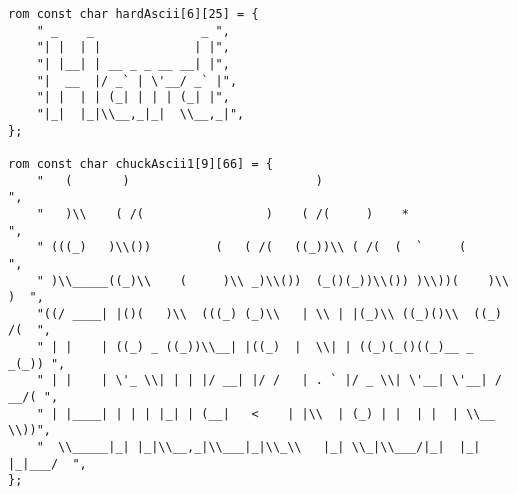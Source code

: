 \begin{lstlisting}
rom const char hardAscii[6][25] = {
	" _    _               _ ",
	"| |  | |             | |",
	"| |__| | __ _ _ __ __| |",
	"|  __  |/ _` | \'__/ _` |",
	"| |  | | (_| | | | (_| |",
	"|_|  |_|\\__,_|_|  \\__,_|",
};

rom const char chuckAscii1[9][66] = {
	"   (       )                          )                          ",
	"   )\\    ( /(                 )    ( /(     )    *               ",
	" (((_)   )\\())         (   ( /(   ((_))\\ ( /(  (  `     (        ",
	" )\\_____((_)\\    (     )\\ _)\\())  (_()(_))\\()) )\\))(    )\\    )  ",
	"((/ ____| |()(   )\\  (((_) (_)\\   | \\ | |(_)\\ ((_)()\\  ((_)  /(  ",
	" | |    | ((_) _ ((_))\\__| |((_)  |  \\| | ((_)(_()((_)__ _ _(_)) ",
	" | |    | \'_ \\| | | |/ __| |/ /   | . ` |/ _ \\| \'__| \'__| / __/( ",
	" | |____| | | | |_| | (__|   <    | |\\  | (_) | |  | |  | \\__ \\))",
	"  \\_____|_| |_|\\__,_|\\___|_|\\_\\   |_| \\_|\\___/|_|  |_|  |_|___/  ",
};


\end{lstlisting}
